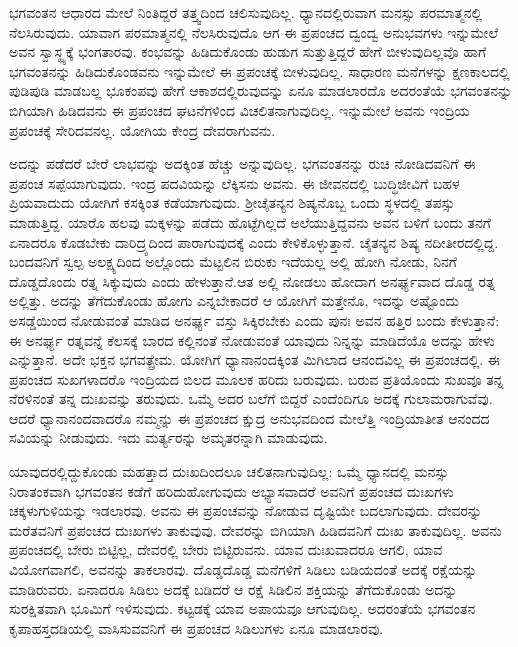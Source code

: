 ಭಗವಂತನ ಆಧಾರದ ಮೇಲೆ ನಿಂತಿದ್ದರೆ ತತ್ತ್ವದಿಂದ ಚಲಿಸುವುದಿಲ್ಲ. ಧ್ಯಾನದಲ್ಲಿರುವಾಗ ಮನಸ್ಸು ಪರಮಾತ್ಮನಲ್ಲಿ ನೆಲಸಿರುವುದು. ಯಾವಾಗ ಪರಮಾತ್ಮನಲ್ಲಿ ನೆಲಸಿರುವುದೊ ಆಗ ಈ ಪ್ರಪಂಚದ ದ್ವಂದ್ವ ಅನುಭವಗಳು ಇನ್ನುಮೇಲೆ ಅವನ ಸ್ವಾಸ್ಥ್ಯಕ್ಕೆ ಭಂಗತಾರವು. ಕಂಭವನ್ನು ಹಿಡಿದುಕೊಂಡು ಹುಡುಗ ಸುತ್ತುತ್ತಿದ್ದರೆ ಹೇಗೆ ಬೀಳುವುದಿಲ್ಲವೊ ಹಾಗೆ ಭಗವಂತನನ್ನು ಹಿಡಿದುಕೊಂಡವನು ಇನ್ನುಮೇಲೆ ಈ ಪ್ರಪಂಚಕ್ಕೆ ಬೀಳುವುದಿಲ್ಲ. ಸಾಧಾರಣ ಮನೆಗಳನ್ನು ಕ್ಷಣಕಾಲದಲ್ಲಿ ಪುಡಿಪುಡಿ ಮಾಡಬಲ್ಲ ಭೂಕಂಪವು ಹೇಗೆ ಆಕಾಶದಲ್ಲಿರುವುದನ್ನು ಏನೂ ಮಾಡಲಾರದೊ ಅದರಂತೆಯೆ ಭಗವಂತನನ್ನು ಬಿಗಿಯಾಗಿ ಹಿಡಿದವನು ಈ ಪ್ರಪಂಚದ ಘಟನೆಗಳಿಂದ ವಿಚಲಿತನಾಗುವುದಿಲ್ಲ. ಇನ್ನುಮೇಲೆ ಅವನು ಇಂದ್ರಿಯ ಪ್ರಪಂಚಕ್ಕೆ ಸೇರಿದವನಲ್ಲ. ಯೋಗಿಯ ಕೇಂದ್ರ ದೇವರಾಗುವನು.

ಅದನ್ನು ಪಡೆದರೆ ಬೇರೆ ಲಾಭವನ್ನು ಅದಕ್ಕಿಂತ ಹೆಚ್ಚು ಅನ್ನುವುದಿಲ್ಲ. ಭಗವಂತನನ್ನು ರುಚಿ ನೋಡಿದವನಿಗೆ ಈ ಪ್ರಪಂಚ ಸಪ್ಪೆಯಾಗುವುದು. ಇಂದ್ರ ಪದವಿಯನ್ನು ಲೆಕ್ಕಿಸನು ಅವನು. ಈ ಜೀವನದಲ್ಲಿ ಬುದ್ಧಿಜೀವಿಗೆ ಬಹಳ ಪ್ರಿಯವಾದುದು ಯೋಗಿಗೆ ಕಸಕ್ಕಿಂತ ಕಡೆಯಾಗುವುದು. ಶ‍್ರೀಚೈತನ್ಯನ ಶಿಷ್ಯನೊಬ್ಬ ಒಂದು ಸ್ಥಳದಲ್ಲಿ ತಪಸ್ಸು ಮಾಡುತ್ತಿದ್ದ. ಯಾರೊ ಹಲವು ಮಕ್ಕಳನ್ನು ಪಡೆದು ಹೊಟ್ಟೆಗಿಲ್ಲದೆ ಅಲೆಯುತ್ತಿದ್ದವನು ಅವನ ಬಳಿಗೆ ಬಂದು ತನಗೆ ಏನಾದರೂ ಕೊಡಬೇಕು ದಾರಿದ್ರ್ಯದಿಂದ ಪಾರಾಗುವುದಕ್ಕೆ ಎಂದು ಕೇಳಿಕೊಳ್ಳುತ್ತಾನೆ. ಚೈತನ್ಯನ ಶಿಷ್ಯ ನದೀತೀರದಲ್ಲಿದ್ದ. ಬಂದವನಿಗೆ ಸ್ವಲ್ಪ ಅಲಕ್ಷ್ಯದಿಂದ ಅಲ್ಲೊಂದು ಮೆಟ್ಟಲಿನ ಬಿರುಕು ಇದೆಯಲ್ಲ ಅಲ್ಲಿ ಹೋಗಿ ನೋಡು, ನಿನಗೆ ದೊಡ್ಡದೊಂದು ರತ್ನ ಸಿಕ್ಕುವುದು ಎಂದು ಹೇಳುತ್ತಾನೆ.\break ಆತ ಅಲ್ಲಿ ನೋಡಲು ಹೋದಾಗ ಅನರ್ಘ್ಯವಾದ ದೊಡ್ಡ ರತ್ನ ಅಲ್ಲಿತ್ತು. ಅದನ್ನು ತೆಗೆದುಕೊಂಡು ಹೋಗು ಎನ್ನಬೇಕಾದರೆ ಆ ಯೋಗಿಗೆ ಮತ್ತೇನೊ, ಇದನ್ನು ಅಷ್ಟೊಂದು ಅಸಡ್ಡೆಯಿಂದ ನೋಡುವಂತೆ ಮಾಡಿದ ಅನರ್ಘ್ಯ ವಸ್ತು ಸಿಕ್ಕಿರಬೇಕು ಎಂದು ಪುನಃ ಅವನ ಹತ್ತಿರ ಬಂದು ಕೇಳುತ್ತಾನೆ: ಈ ಅನರ್ಘ್ಯ ರತ್ನವನ್ನೆ ಕೆಲಸಕ್ಕೆ ಬಾರದ ಕಲ್ಲಿನಂತೆ ನೋಡುವಂತೆ ಯಾವುದು ನಿನ್ನನ್ನು ಮಾಡಿದೆಯೊ ಅದನ್ನು ಹೇಳು ಎನ್ನುತ್ತಾನೆ. ಅದೇ ಭಕ್ತನ ಭಗವತ್ಪ್ರೇಮ. ಯೋಗಿಗೆ ಧ್ಯಾನಾನಂದಕ್ಕಿಂತ ಮಿಗಿಲಾದ ಆನಂದವಿಲ್ಲ ಈ ಪ್ರಪಂಚದಲ್ಲಿ. ಈ ಪ್ರಪಂಚದ ಸುಖಗಳಾದರೊ ಇಂದ್ರಿಯದ ಬಿಲದ ಮೂಲಕ ಹರಿದು ಬರುವುದು. ಬರುವ ಪ್ರತಿಯೊಂದು ಸುಖವೂ ತನ್ನ ನೆರಳಿನಂತೆ ತನ್ನ ದುಃಖವನ್ನು ತರುವುದು. ಒಮ್ಮೆ ಅದರ ಬಲೆಗೆ ಬಿದ್ದರೆ ಎಂದೆಂದಿಗೂ ಅದಕ್ಕೆ ಗುಲಾಮರಾಗುವೆವು. ಆದರೆ ಧ್ಯಾನಾನಂದವಾದರೊ ನಮ್ಮನ್ನು ಈ ಪ್ರಪಂಚದ ಕ್ಷುದ್ರ ಅನುಭವದಿಂದ ಮೇಲೆತ್ತಿ ಇಂದ್ರಿಯಾತೀತ ಆನಂದದ ಸವಿಯನ್ನು ನೀಡುವುದು. ಇದು ಮರ್ತ್ಯರನ್ನು ಅಮೃತರನ್ನಾಗಿ ಮಾಡುವುದು.

ಯಾವುದರಲ್ಲಿದ್ದುಕೊಂಡು ಮಹತ್ತಾದ ದುಃಖದಿಂದಲೂ ಚಲಿತನಾಗುವುದಿಲ್ಲ: ಒಮ್ಮೆ ಧ್ಯಾನದಲ್ಲಿ ಮನಸ್ಸು ನಿರಾತಂಕವಾಗಿ ಭಗವಂತನ ಕಡೆಗೆ ಹರಿದುಹೋಗುವುದು ಅಭ್ಯಾಸವಾದರೆ ಅವನಿಗೆ ಪ್ರಪಂಚದ ದುಃಖಗಳು ಚಕ್ಕಳುಗುಳಿಯನ್ನು ಇಡಲಾರವು. ಅವನು ಈ ಪ್ರಪಂಚವನ್ನು ನೋಡುವ ದೃಷ್ಟಿಯೇ ಬದಲಾಗುವುದು. ದೇವರನ್ನು ಮರೆತವನಿಗೆ ಪ್ರಪಂಚದ ದುಃಖಗಳು ತಾಕುವುವು. ದೇವರನ್ನು ಬಿಗಿಯಾಗಿ ಹಿಡಿದವನಿಗೆ ದುಃಖ ತಾಕುವುದಿಲ್ಲ. ಅವನು ಪ್ರಪಂಚದಲ್ಲಿ ಬೇರು ಬಿಟ್ಟಿಲ್ಲ, ದೇವರಲ್ಲಿ ಬೇರು ಬಿಟ್ಟಿರುವನು. ಯಾವ ದುಃಖವಾದರೂ ಆಗಲಿ, ಯಾವ ವಿಯೋಗವಾಗಲಿ, ಅವನನ್ನು ತಾಕಲಾರವು. ದೊಡ್ಡದೊಡ್ಡ ಮನೆಗಳಿಗೆ ಸಿಡಿಲು ಬಡಿಯದಂತೆ ಅದಕ್ಕೆ ರಕ್ಷೆಯನ್ನು ಮಾಡಿರುವರು. ಏನಾದರೂ ಸಿಡಿಲು ಅದಕ್ಕೆ ಬಡಿದರೆ ಆ ರಕ್ಷೆ ಸಿಡಿಲಿನ ಶಕ್ತಿಯನ್ನು ತೆಗೆದುಕೊಂಡು ಅದನ್ನು ಸುರಕ್ಷಿತವಾಗಿ ಭೂಮಿಗೆ ಇಳಿಸುವುದು. ಕಟ್ಟಡಕ್ಕೆ ಯಾವ ಅಪಾಯವೂ ಆಗುವುದಿಲ್ಲ. ಅದರಂತೆಯೆ ಭಗವಂತನ ಕೃಪಾಹಸ್ತದಡಿಯಲ್ಲಿ ವಾಸಿಸುವವನಿಗೆ ಈ ಪ್ರಪಂಚದ ಸಿಡಿಲುಗಳು ಏನೂ ಮಾಡಲಾರವು.


